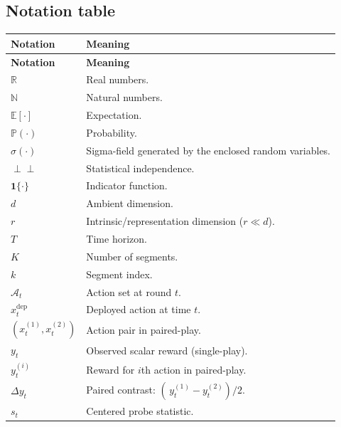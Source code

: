 \documentclass[12pt]{article}
\newcommand{\R}{\mathbb{R}}
\newcommand{\N}{\mathbb{N}}
\newcommand{\E}{\mathbb{E}}
\newcommand{\Prob}{\mathbb{P}}
\newcommand{\cA}{\mathcal{A}}
\theoremstyle{plain}
\theoremstyle{definition}
\begin{document}
\begin{appendix}
\section{Notation table}
\label{app:notation}

\begin{center}
\small
\setlength{\tabcolsep}{5pt}
\renewcommand{\arraystretch}{1.18}

\begin{longtable}{l p{}}
\hline
\textbf{Notation} & \textbf{Meaning} \\
\hline
\endfirsthead
\hline
\textbf{Notation} & \textbf{Meaning} \\
\hline
\endhead
\hline
\endfoot
\hline
\endlastfoot

$\R$ & Real numbers. \\
$\N$ & Natural numbers. \\
$\E[\cdot]$ & Expectation. \\
$\Prob(\cdot)$ & Probability. \\
$\sigma(\cdot)$ & Sigma-field generated by the enclosed random variables. \\
$\perp\!\!\!\perp$ & Statistical independence. \\
$\mathbf{1}\{\cdot\}$ & Indicator function. \\

$d$ & Ambient dimension. \\
$r$ & Intrinsic/representation dimension ($r \ll d$). \\
$T$ & Time horizon. \\
$K$ & Number of segments. \\
$k$ & Segment index. \\

$\cA_t$ & Action set at round $t$. \\
$x_t^{\mathrm{dep}}$ & Deployed action at time $t$. \\
$(x_t^{(1)}, x_t^{(2)})$ & Action pair in paired-play. \\

$y_t$ & Observed scalar reward (single-play). \\
$y_t^{(i)}$ & Reward for $i$th action in paired-play. \\
$\Delta y_t$ & Paired contrast: $(\,y_t^{(1)} - y_t^{(2)})/2$. \\
$s_t$ & Centered probe statistic. \\


\end{longtable}
\end{center}
\end{appendix}
\end{document}
